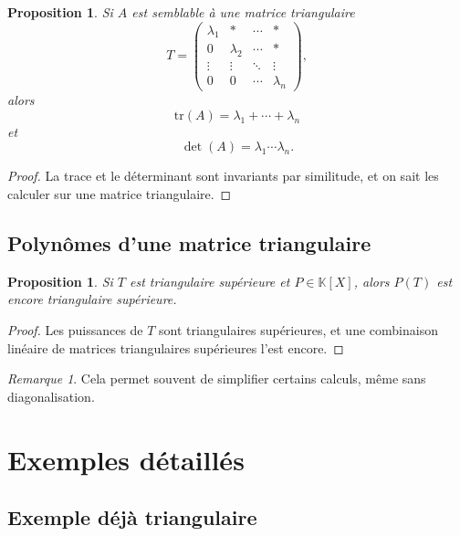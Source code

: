 \documentclass[11pt,a4paper]{article}
\newtheorem{proposition}[definition]{Proposition}
\theoremstyle{remark}
\newtheorem{remarque}[definition]{Remarque}
\newcommand{\K}{\mathbb{K}}
\newcommand{\tr}{\mathrm{tr}}
\begin{document}
\begin{proposition}
Si \(A\) est semblable à une matrice triangulaire
\[
T=
\begin{pmatrix}
\lambda_1 & * & \cdots & *\\
0 & \lambda_2 & \cdots & *\\
\vdots & \vdots & \ddots & \vdots\\
0 & 0 & \cdots & \lambda_n
\end{pmatrix},
\]
alors
\[
\tr(A)=\lambda_1+\cdots+\lambda_n
\]
et
\[
\det(A)=\lambda_1\cdots\lambda_n.
\]
\end{proposition}

\begin{proof}
La trace et le déterminant sont invariants par similitude, et on sait les calculer sur une matrice triangulaire.
\end{proof}

\subsection{Polynômes d’une matrice triangulaire}

\begin{proposition}
Si \(T\) est triangulaire supérieure et \(P\in\K[X]\), alors \(P(T)\) est encore triangulaire supérieure.
\end{proposition}

\begin{proof}
Les puissances de \(T\) sont triangulaires supérieures, et une combinaison linéaire de matrices triangulaires supérieures l’est encore.
\end{proof}

\begin{remarque}
Cela permet souvent de simplifier certains calculs, même sans diagonalisation.
\end{remarque}

\section{Exemples détaillés}

\subsection{Exemple déjà triangulaire}
\end{document}
